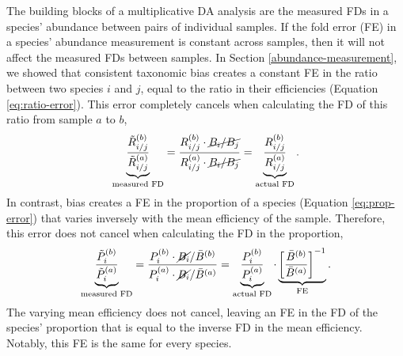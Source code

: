 \documentclass[
]{article}
\begin{document}
The building blocks of a multiplicative DA analysis are the measured FDs in a species' abundance between pairs of individual samples.
If the fold error (FE) in a species' abundance measurement is constant across samples, then it will not affect the measured FDs between samples.
In Section \ref{abundance-measurement}, we showed that consistent taxonomic bias creates a constant FE in the ratio between two species \(i\) and \(j\), equal to the ratio in their efficiencies (Equation \eqref{eq:ratio-error}).
This error completely cancels when calculating the FD of this ratio from sample \(a\) to \(b\),
\begin{align}
  \label{eq:ratio-fc-error}
\underbrace{\frac{\tilde R_{i/j}^{(b)}}{\tilde R_{i/j}^{(a)}}}_\text{measured FD}
  = \frac
    {R_{i/j}^{(b)} \cdot \cancel{B_i / B_j}}
    {R_{i/j}^{(a)} \cdot \cancel{B_i / B_j}}
  =
  \underbrace{\frac{R_{i/j}^{(b)}}{R_{i/j}^{(a)}}}_\text{actual FD}
  .
\end{align}
In contrast, bias creates a FE in the proportion of a species (Equation \eqref{eq:prop-error}) that varies inversely with the mean efficiency of the sample.
Therefore, this error does not cancel when calculating the FD in the proportion,
\begin{align}
  \label{eq:prop-fc-error}
\underbrace{\frac{\tilde P_i^{(b)}}{\tilde P_i^{(a)}}}_\text{measured FD}
  = \frac
    {P_i^{(b)} \cdot \cancel{B_i} / \bar B^{(b)}}
    {P_i^{(a)} \cdot \cancel{B_i} / \bar B^{(a)}}
  =
  \underbrace{\frac{P_i^{(b)}}{P_i^{(a)}}}_\text{actual FD}
  \cdot
  \underbrace{\left[\frac{\bar B^{(b)}}{\bar B^{(a)}}\right]^{-1}}_\text{FE}
  .
\end{align}
The varying mean efficiency does not cancel, leaving an FE in the FD of the species' proportion that is equal to the inverse FD in the mean efficiency.
Notably, this FE is the same for every species.
\end{document}
